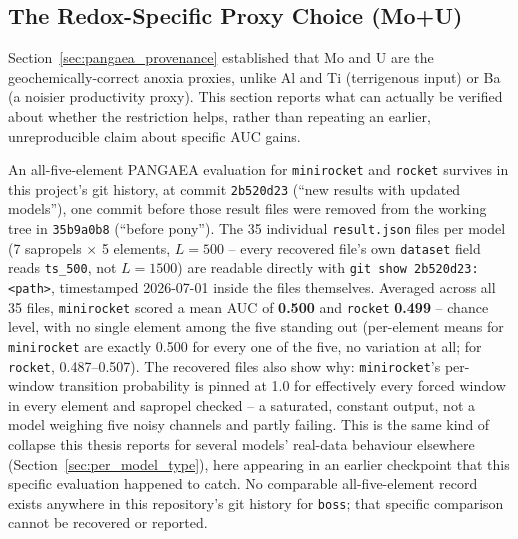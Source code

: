\subsection{The Redox-Specific Proxy Choice (Mo+U)}
\label{sec:proxy_check}
Section~\ref{sec:pangaea_provenance} established that Mo and U are the geochemically-correct anoxia proxies, unlike Al and Ti (terrigenous input) or Ba (a noisier productivity proxy). This section reports what can actually be verified about whether the restriction helps, rather than repeating an earlier, unreproducible claim about specific AUC gains.

An all-five-element PANGAEA evaluation for \texttt{minirocket} and \texttt{rocket} survives in this project's git history, at commit \texttt{2b520d23} (``new results with updated models''), one commit before those result files were removed from the working tree in \texttt{35b9a0b8} (``before pony''). The 35 individual \texttt{result.json} files per model (7 sapropels $\times$ 5 elements, $L{=}500$ -- every recovered file's own \texttt{dataset} field reads \texttt{ts\_500}, not $L{=}1500$) are readable directly with \texttt{git show 2b520d23:<path>}, timestamped 2026-07-01 inside the files themselves. Averaged across all 35 files, \texttt{minirocket} scored a mean AUC of \textbf{0.500} and \texttt{rocket} \textbf{0.499} -- chance level, with no single element among the five standing out (per-element means for \texttt{minirocket} are exactly 0.500 for every one of the five, no variation at all; for \texttt{rocket}, 0.487--0.507). The recovered files also show why: \texttt{minirocket}'s per-window transition probability is pinned at 1.0 for effectively every forced window in every element and sapropel checked -- a saturated, constant output, not a model weighing five noisy channels and partly failing. This is the same kind of collapse this thesis reports for several models' real-data behaviour elsewhere (Section~\ref{sec:per_model_type}), here appearing in an earlier checkpoint that this specific evaluation happened to catch. No comparable all-five-element record exists anywhere in this repository's git history for \texttt{boss}; that specific comparison cannot be recovered or reported.

